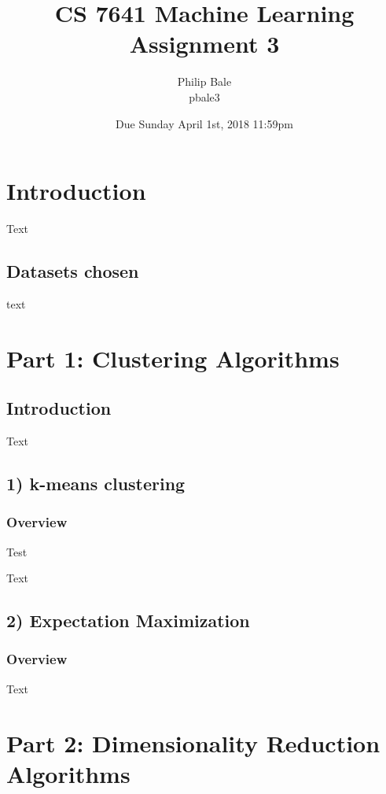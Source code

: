 \documentclass[h]{article}
\title{CS 7641 Machine Learning \\ Assignment 3}
\date{Due Sunday April 1st, 2018 11:59pm}
\author{Philip Bale \\ pbale3}
\begin{document}
\maketitle

\section*{Introduction}  
Text

\subsection*{Datasets chosen}  
text

\section*{Part 1: Clustering Algorithms}
\subsection*{Introduction}  
Text 

\subsection*{1) k-means clustering}  
\subsubsection*{Overview}
Test
 

Text

\subsection*{2) Expectation Maximization}  
\subsubsection*{Overview}
Text

 
\section*{Part 2: Dimensionality Reduction Algorithms}
\end{document}
